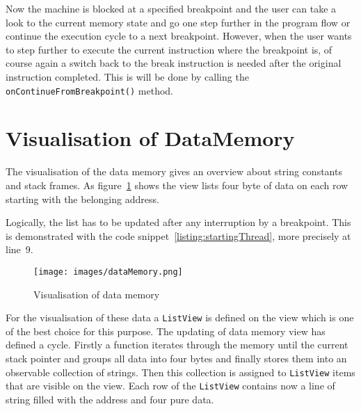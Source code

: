 Now the machine is blocked at a specified breakpoint and the user can take a look to the current memory state and go one step further in the program flow or continue the execution cycle to a next breakpoint. However, when the user wants to step further to execute the current instruction where the breakpoint is, of course again a switch back to the break instruction is needed after the original instruction completed. This is will be done by calling the \texttt{onContinueFromBreakpoint()} method.
\section{Visualisation of DataMemory}
\label{sec:implementationOfDataVisualisation}
The visualisation of the data memory gives an overview about string constants and stack frames. As figure~\ref{fig:dataMemoryView} shows the view lists four byte of data on each row starting with the belonging address. 

Logically, the list has to be updated after any interruption by a breakpoint. This is demonstrated with the code snippet~\ref{listing:startingThread}, more precisely at line~9.

\begin{figure}[h] 
	\centering
	\texttt{[image: images/dataMemory.png]}
	\caption{Visualisation of data memory}
	\label{fig:dataMemoryView}
\end{figure}

For the visualisation of these data a \texttt{ListView} is defined on the view which is one of the best choice for this purpose. 
The updating of data memory view has defined a cycle. Firstly a function iterates through the memory until the current stack pointer and groups all data into four bytes and finally stores them into an observable collection of strings. Then this collection is assigned to \texttt{ListView} items that are visible on the view. Each row of the \texttt{ListView} contains now a line of string filled with the address and four pure data. 

